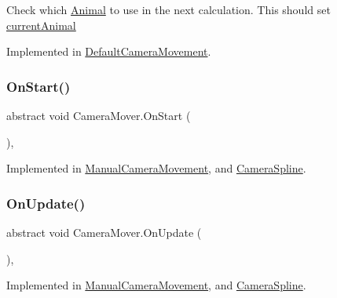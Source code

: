 Check which \mbox{\hyperlink{class_animal}{Animal}} to use in the next calculation. This should set \mbox{\hyperlink{class_camera_mover_a8b863da058e5a1984fd686e09ee2689f}{current\+Animal}} 



Implemented in \mbox{\hyperlink{class_default_camera_movement_a27024061b5779124b7fac73acaed7c1d}{Default\+Camera\+Movement}}.

\mbox{\label{class_camera_mover_ab96169179c915b4c8599c956dc572fc7}} 
\subsubsection{\texorpdfstring{On\+Start()}{OnStart()}}
{\footnotesize\ttfamily abstract void Camera\+Mover.\+On\+Start (\begin{DoxyParamCaption}{ }\end{DoxyParamCaption})\hspace{0.3cm}{\ttfamily [protected]}, {}}



Implemented in \mbox{\hyperlink{class_manual_camera_movement_a7d176cf631d84d7c34b2407fd810adcf}{Manual\+Camera\+Movement}}, and \mbox{\hyperlink{class_camera_spline_a8c3df3fb0d0ba26126d97432331a209b}{Camera\+Spline}}.

\mbox{\label{class_camera_mover_add4a882d9c8684a75d9d2cdacf90a74f}} 
\subsubsection{\texorpdfstring{On\+Update()}{OnUpdate()}}
{\footnotesize\ttfamily abstract void Camera\+Mover.\+On\+Update (\begin{DoxyParamCaption}{ }\end{DoxyParamCaption})\hspace{0.3cm}{\ttfamily [protected]}, {}}



Implemented in \mbox{\hyperlink{class_manual_camera_movement_a0ea298439b1602ebd031bcccd411e2f4}{Manual\+Camera\+Movement}}, and \mbox{\hyperlink{class_camera_spline_a52812811103b9fca941daf2edd3c763d}{Camera\+Spline}}.

